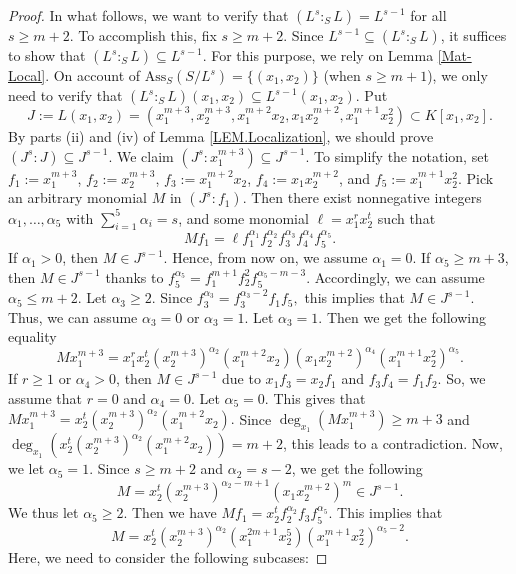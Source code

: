 \documentclass[11pt]{amsart}
\begin{document}
\begin{proof}
 In what follows, we want to verify that  $(L^s:_SL)= L^{s-1}$    for all $s \geq m+2$. To accomplish this, fix $s\geq m+2$. 
  Since $L^{s-1} \subseteq (L^s:_SL)$,  it suffices to show that $(L^s:_SL) \subseteq L^{s-1}$. For this purpose, we rely on Lemma \ref{Mat-Local}. 
 On account of   $\mathrm{Ass}_S(S/L^s)=\{(x_1, x_2)\}$ (when $s\geq m+1$),  we only need  to verify that  
    $(L^s:_SL)(x_1,x_2) \subseteq L^{s-1}(x_1,x_2)$.  Put 
    $$J:=L(x_1,x_2)=(x_1^{m+3}, x_2^{m+3}, x_1^{m+2}x_2, x_1x_2^{m+2}, x_1^{m+1}x_2^{2}) \subset K[x_1,x_2].$$
    By parts (ii) and (iv) of Lemma \ref{LEM.Localization}, we should prove $(J^s:J) \subseteq J^{s-1}$.
     We claim     $(J^s: x_1^{m+3}) \subseteq  J^{s-1}$.   To simplify the notation, set  $f_1:=x_1^{m+3}$, $f_2:=x_2^{m+3}$, $f_3:=x_1^{m+2}x_2$, 
 $f_4:=x_1x_2^{m+2}$, and $f_5:=x_1^{m+1}x_2^{2}$.  Pick an arbitrary monomial $M$ in  $(J^s: f_1)$.  Then there exist nonnegative integers 
 $\alpha_1, \ldots, \alpha_5$ with  $\sum_{i=1}^5\alpha_i=s$, and some monomial $\ell=x_1^{r}x_2^{t}$ such that 
 $$Mf_1= \ell f_1^{\alpha_1} f_2^{\alpha_2} f_3^{\alpha_3} f_4^{\alpha_4} f_5^{\alpha_5}.$$ 
  If $\alpha_1>0$, then $M\in J^{s-1}$. Hence, from now on, we assume    $\alpha_1=0$.  If $\alpha_5 \geq m+3$, then $M\in J^{s-1}$ thanks to  $f_5^{\alpha_5}=f_1^{m+1}f_2^{2} f_5^{\alpha_5-m-3}$.   Accordingly, we can assume  $\alpha_5\leq m+2$. 
 Let $\alpha_3\geq 2$. Since  $f_3^{\alpha_3}=f_3^{\alpha_3-2}f_1 f_5,$ this implies that $M\in J^{s-1}$. 
 Thus, we can assume  $\alpha_3=0$ or $\alpha_3=1$. Let $\alpha_3=1$. Then we get the following equality 
  $$Mx_1^{m+3}= x_1^rx_2^t (x_2^{m+3})^{\alpha_2} (x_1^{m+2}x_2) (x_1x_2^{m+2})^{\alpha_4} (x_1^{m+1}x_2^{2})^{\alpha_5}.$$
 If $r\geq 1$ or  $\alpha_4>0$, then $M\in J^{s-1}$ due to $x_1f_3=x_2f_1$ and $f_3f_4=f_1f_2$.  So, we assume that $r=0$ and   $\alpha_4=0$. 
 Let  $\alpha_5=0$. This gives that 
 $Mx_1^{m+3}= x_2^t (x_2^{m+3})^{\alpha_2} (x_1^{m+2}x_2).$ Since  $\deg_{x_1}(Mx_1^{m+3})\geq m+3$ and 
 $\deg_{x_1}(x_2^t (x_2^{m+3})^{\alpha_2} (x_1^{m+2}x_2))=m+2$, this leads to a contradiction. Now, we let $\alpha_5=1$. Since $s\geq m+2$ and 
 $\alpha_2=s-2$, we get the following 
 $$M=x_2^t(x_2^{m+3})^{\alpha_2-m+1} (x_1x_2^{m+2})^{m}\in J^{s-1}.$$
 We thus let $\alpha_5\geq 2$. Then we have $Mf_1=x_2^tf_2^{\alpha_2} f_3f_5^{\alpha_5}$. This implies that 
  \begin{equation} \label{19}
   M=x^t_2(x_2^{m+3})^{\alpha_2} (x_1^{2m+1}x_2^5) (x_1^{m+1}x_2^2)^{\alpha_5-2}.
   \end{equation}
 Here, we need to consider the following subcases:
 

\end{proof}
\end{document}
